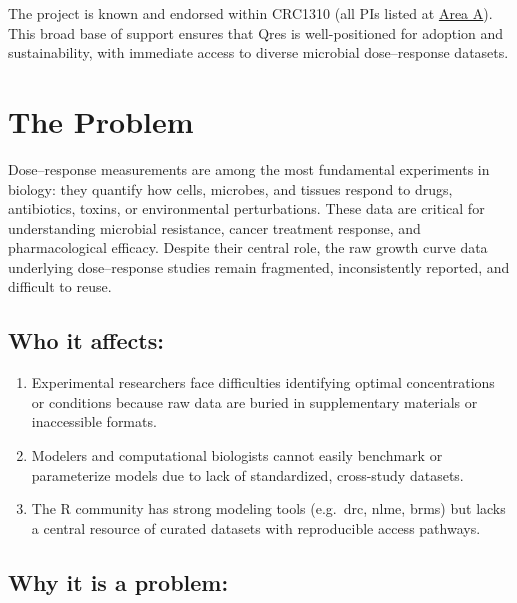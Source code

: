 \documentclass[
  letterpaper,
  DIV=11,
  numbers=noendperiod]{scrartcl}
\providecommand{\tightlist}{%
  \setlength{\itemsep}{0pt}\setlength{\parskip}{0pt}}
\begin{document}
The project is known and endorsed within CRC1310 (all PIs listed at
\href{crc1310.uni-koeln.de/project_a.html}{Area A}). This broad base of
support ensures that Qres is well-positioned for adoption and
sustainability, with immediate access to diverse microbial
dose--response datasets.

\section{The Problem}\label{the-problem}

Dose--response measurements are among the most fundamental experiments
in biology: they quantify how cells, microbes, and tissues respond to
drugs, antibiotics, toxins, or environmental perturbations. These data
are critical for understanding microbial resistance, cancer treatment
response, and pharmacological efficacy. Despite their central role, the
raw growth curve data underlying dose--response studies remain
fragmented, inconsistently reported, and difficult to reuse.

\subsection{Who it affects:}\label{who-it-affects}

\begin{enumerate}
\def\labelenumi{\arabic{enumi}.}
\tightlist
\item
  Experimental researchers face difficulties identifying optimal
  concentrations or conditions because raw data are buried in
  supplementary materials or inaccessible formats.
\item
  Modelers and computational biologists cannot easily benchmark or
  parameterize models due to lack of standardized, cross-study datasets.
\item
  The R community has strong modeling tools (e.g.~drc, nlme, brms) but
  lacks a central resource of curated datasets with reproducible access
  pathways.
\end{enumerate}

\subsection{Why it is a problem:}\label{why-it-is-a-problem}
\end{document}
